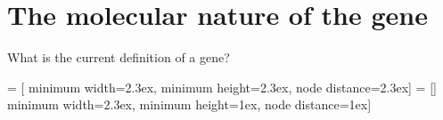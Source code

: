 \section{The molecular nature of the gene}

\begin{frame}[t]
    What is the current definition of a gene?

\end{frame}

 = [
    minimum width=2.3ex, minimum height=2.3ex, node distance=2.3ex]
 = []
    minimum width=2.3ex, minimum height=1ex, node distance=1ex]

